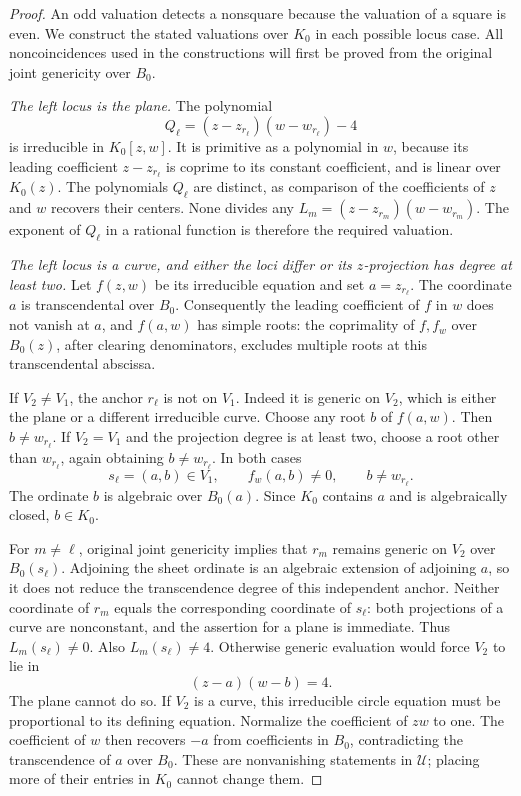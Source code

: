 \begin{proof}
An odd valuation detects a nonsquare because the valuation of a square
is even. We construct the stated valuations over \(K_0\) in each
possible locus case. All noncoincidences used in the constructions will
first be proved from the original joint genericity over \(B_0\).

\emph{The left locus is the plane.}
The polynomial
\[
 Q_\ell=(z-z_{r_\ell})(w-w_{r_\ell})-4
\]
is irreducible in \(K_0[z,w]\). It is primitive as a polynomial in
\(w\), because its leading coefficient \(z-z_{r_\ell}\) is coprime
to its constant coefficient, and is linear over \(K_0(z)\). The
polynomials \(Q_\ell\) are distinct, as comparison of the coefficients
of \(z\) and \(w\) recovers their centers. None divides any
\(L_m=(z-z_{r_m})(w-w_{r_m})\). The exponent of \(Q_\ell\) in a
rational function is therefore the required valuation.

\emph{The left locus is a curve, and either the loci differ or its
\(z\)-projection has degree at least two.}
Let \(f(z,w)\) be its irreducible equation and set
\(a=z_{r_\ell}\). The coordinate \(a\) is transcendental over
\(B_0\). Consequently the leading coefficient of \(f\) in \(w\)
does not vanish at \(a\), and \(f(a,w)\) has simple roots: the
coprimality of \(f,f_w\) over \(B_0(z)\), after clearing denominators,
excludes multiple roots at this transcendental abscissa.

If \(V_2\ne V_1\), the anchor \(r_\ell\) is not on \(V_1\).
Indeed it is generic on \(V_2\), which is either the plane or a
different irreducible curve. Choose any root \(b\) of \(f(a,w)\).
Then \(b\ne w_{r_\ell}\). If \(V_2=V_1\) and the projection degree
is at least two, choose a root other than \(w_{r_\ell}\), again
obtaining \(b\ne w_{r_\ell}\). In both cases
\[
 s_\ell=(a,b)\in V_1,\qquad
 f_w(a,b)\ne0,\qquad b\ne w_{r_\ell}.
\]
The ordinate \(b\) is algebraic over \(B_0(a)\). Since \(K_0\)
contains \(a\) and is algebraically closed, \(b\in K_0\).

For \(m\ne\ell\), original joint genericity implies that
\(r_m\) remains generic on \(V_2\) over \(B_0(s_\ell)\).
Adjoining the sheet ordinate is an algebraic extension of adjoining
\(a\), so it does not reduce the transcendence degree of this
independent anchor. Neither coordinate of \(r_m\) equals the
corresponding coordinate of \(s_\ell\): both projections of a curve
are nonconstant, and the assertion for a plane is immediate.
Thus \(L_m(s_\ell)\ne0\). Also
\(L_m(s_\ell)\ne4\). Otherwise generic evaluation would force
\(V_2\) to lie in
\[
 (z-a)(w-b)=4.
\]
The plane cannot do so. If \(V_2\) is a curve, this irreducible
circle equation must be proportional to its defining equation.
Normalize the coefficient of \(zw\) to one. The coefficient of
\(w\) then recovers \(-a\) from coefficients in \(B_0\),
contradicting the transcendence of \(a\) over \(B_0\).
These are nonvanishing statements in \(\mathcal U\); placing more of their
entries in \(K_0\) cannot change them.


\end{proof}
